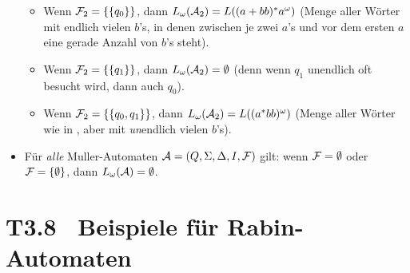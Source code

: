 \documentclass[fontsize=11pt, twoside=false, numbers=autoenddot]{scrbook}
\begin{document}
\begin{itemize}
\begin{center}
    \end{center}
    \begin{itemize}
      \item[\bspnr{(M5)}]
        Wenn $\mathcal{F}_2 = \{\{q_0\}\}$, dann $L_\omega(\mathcal{A}_2) = L((a+bb)^*a^\omega)$ (Menge aller Wörter mit endlich vielen $b$'s, in denen zwischen je zwei $a$'s und vor dem ersten $a$ eine gerade Anzahl von $b$'s steht).
      \item[\bspnr{(M6)}]
        Wenn $\mathcal{F}_2 = \{\{q_1\}\}$, dann $L_\omega(\mathcal{A}_2) = \emptyset$ (denn wenn $q_1$ unendlich oft besucht wird, dann auch $q_0$).
      \item[\bspnr{(M7)}]
        Wenn $\mathcal{F}_2 = \{\{q_0,q_1\}\}$, dann $L_\omega(\mathcal{A}_2) = L((a^*bb)^\omega)$ (Menge aller Wörter wie in , aber mit \emph{un}endlich vielen $b$'s).
    \end{itemize}
    \par\medskip    
  \item 
    Für \emph{alle} Muller-Automaten $\mathcal{A} = (Q,\Sigma,\Delta,I,\mathcal{F})$ gilt:
    wenn $\mathcal{F} = \emptyset$ oder $\mathcal{F} = \{\emptyset\}$,
    dann $L_\omega(\mathcal{A}) = \emptyset$.
\end{itemize}

\section*{T3.8~ Beispiele für Rabin-Automaten}
\end{document}
